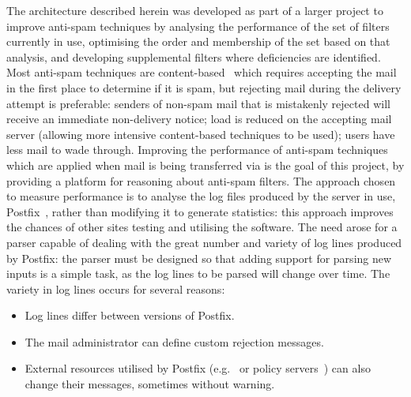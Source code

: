\documentclass{svmult}
\begin{document}
The architecture described herein was developed as part of a larger project
to improve anti-spam techniques by analysing the performance of the set of
filters currently in use, optimising the order and membership of the set
based on that analysis, and developing supplemental filters where
deficiencies are identified.  Most anti-spam techniques are
content-based~\cite{a-plan-for-spam, word-stemming, relaxed-online-svms}
which requires accepting the mail in the first place to determine if it is
spam, but rejecting mail during the delivery attempt is preferable: senders
of non-spam mail that is mistakenly rejected will receive an immediate
non-delivery notice; load is reduced on the accepting mail server (allowing
more intensive content-based techniques to be used); users have less mail
to wade through.  Improving the performance of anti-spam techniques which
are applied when mail is being transferred via \SMTP{}\footnotemark{} is
the goal of this project, by providing a platform for reasoning about
anti-spam filters.  The approach chosen to measure performance is to
analyse the log files produced by the \SMTP{} server in use,
Postfix~\cite{postfix}, rather than modifying it to generate statistics:
this approach improves the chances of other sites testing and utilising the
software.  The need arose for a parser capable of dealing with the great
number and variety of log lines produced by Postfix: the parser must be
designed so that adding support for parsing new inputs is a simple task, as
the log lines to be parsed will change over time.  The variety in log lines
occurs for several reasons:

\begin{itemize}

    \item Log lines differ between versions of Postfix.
        
    \item The mail administrator can define custom rejection
        messages.

    \item External resources utilised by Postfix (e.g.\ \DNSBL{} or policy
        servers~\cite{policy-servers}) can also change their messages,
        sometimes without warning.

\end{itemize}
\end{document}
